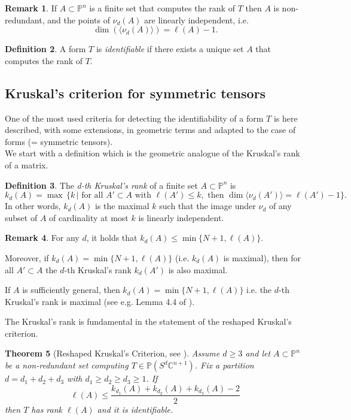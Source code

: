 \documentclass{amsart}
\newcommand{\C}{\mathbb{C}}
\newcommand{\Pj}{\mathbb{P}}
\newtheorem{thm0}{Theorem}[section]
\theoremstyle{definition}
\newtheorem{defn0}[thm0]{Definition}
\newtheorem{rem0}[thm0]{Remark}
\begin{document}
\begin{rem0}\label{rem:indep}
If $ A \subset \Pj^n $ is a finite set that computes the rank of $T$  then $A$ is non-redundant, and the points of $ \nu_{d}(A) $ are 
linearly independent, i.e.
$$ \dim(\langle\nu_{d}(A)\rangle) = \ell(A) -1.  $$
\end{rem0}

\begin{defn0}
A form $T$ is \emph{identifiable} if there exists a unique set $ A $ that computes the rank of $T$. 
\end{defn0}


\subsection{Kruskal's criterion for symmetric tensors}\label{sec:Kr}

One of the most used criteria for detecting the identifiability of a form $T$ is here described,
with some extensions, in geometric terms and adapted to the case of forms (= symmetric tensors).\\
We start with a definition which is the geometric analogue of the Kruskal's rank of a matrix.

\begin{defn0}
The \emph{d-th Kruskal's rank} of a finite set $ A \subset \mathbb{P}^{n} $ is 
$$ k_{d}(A) = \max \,\{k \, | \mbox{ for all } A' \subset A \mbox{ with } \ell(A') \leq k,\mbox{ then } \dim \langle\nu_{d}(A')\rangle = \ell(A') - 1 \}. $$
In other words, $k_d(A)$ is the maximal $k$ such that the image under $\nu_d$ of any subset of $A$ of cardinality
at most $k$ is linearly independent.
\end{defn0} 

\begin{rem0}\label{maxKrank}
For any $ d $, it holds that $ k_{d}(A) \leq \min\{N+1,\ell(A)\} $. 

Moreover,  if $k_d(A)=\min \{N+1,\ell(A)\}$ (i.e. $k_d(A)$ is maximal), then for all $A'\subset A$ the $d$-th Kruskal's rank
$k_d(A')$ is also maximal. 

If $ A $ is sufficiently general, then $ k_{d}(A) = \min\{N+1,\ell(A)\} $ i.e. the $d$-th Kruskal's rank is maximal (see e.g. Lemma 4.4 of \cite{COttVan17b}).
\end{rem0}

The Kruskal's rank is fundamental in the statement of the reshaped Kruskal's criterion.
 
\begin{thm0}[Reshaped Kruskal's Criterion, see \cite{COttVan17b}]\label{thm:kr}
Assume $ d \geq 3 $ and let $ A \subset \mathbb{P}^{n} $ be a non-redundant set computing $ T \in \Pj(S^{d} \C^{n+1}) $.  
Fix a partition  $ d = d_{1}+d_{2}+d_{3} $ with $ d_{1} \geq d_{2} \geq d_{3} \geq 1 $. If 
\begin{equation}\label{eq:Kr}
\ell(A) \leq \frac{k_{d_{1}}(A)+k_{d_{2}}(A)+k_{d_{3}}(A)-2}{2}
\end{equation}
then $ T $ has rank $ \ell(A) $ and it is identifiable.
\end{thm0}
\end{document}
